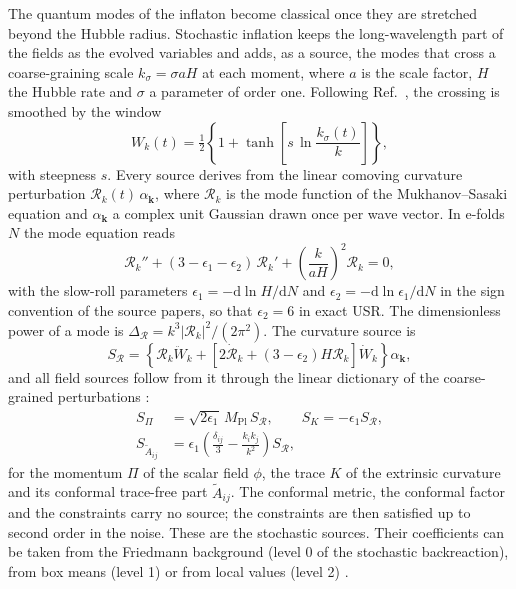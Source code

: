 \documentclass[aps,prd,twocolumn,10pt,superscriptaddress,nofootinbib,longbibliography,floatfix]{revtex4-2}
\newcommand{\dd}{\mathrm{d}}
\newcommand{\Mpl}{M_\mathrm{Pl}}
\begin{document}
The quantum modes of the inflaton become classical once they are stretched beyond the Hubble radius. Stochastic inflation keeps the long-wavelength part of the fields as the evolved variables and adds, as a source, the modes that cross a coarse-graining scale $k_\sigma=\sigma aH$ at each moment, where $a$ is the scale factor, $H$ the Hubble rate and $\sigma$ a parameter of order one. Following Ref.~\cite{Launay:2025sinr}, the crossing is smoothed by the window
\begin{equation}\label{eq:window}
W_k(t)=\tfrac12\left\{1+\tanh\!\left[s\,\ln\frac{k_\sigma(t)}{k}\right]\right\},
\end{equation}
with steepness $s$. Every source derives from the linear comoving curvature perturbation $\mathcal{R}_k(t)\,\alpha_{\bm k}$, where $\mathcal{R}_k$ is the mode function of the Mukhanov--Sasaki equation and $\alpha_{\bm k}$ a complex unit Gaussian drawn once per wave vector. In e-folds $N$ the mode equation reads
\begin{equation}\label{eq:ms}
\mathcal{R}_k''+(3-\epsilon_1-\epsilon_2)\,\mathcal{R}_k'+\left(\frac{k}{aH}\right)^2\mathcal{R}_k=0,
\end{equation}
with the slow-roll parameters $\epsilon_1=-\dd\ln H/\dd N$ and $\epsilon_2=-\dd\ln\epsilon_1/\dd N$ in the sign convention of the source papers, so that $\epsilon_2=6$ in exact USR. The dimensionless power of a mode is $\Delta_\mathcal{R}=k^3|\mathcal{R}_k|^2/(2\pi^2)$. The curvature source is
\begin{equation}\label{eq:SR}
S_\mathcal{R}=\left\{\mathcal{R}_k\ddot W_k+\left[2\dot{\mathcal{R}}_k+(3-\epsilon_2)H\mathcal{R}_k\right]\dot W_k\right\}\alpha_{\bm k},
\end{equation}
and all field sources follow from it through the linear dictionary of the coarse-grained perturbations \cite{Launay:2024sigr,Launay:2025sinr}:
\begin{equation}\label{eq:sources}
\begin{aligned}
S_\Pi&=\sqrt{2\epsilon_1}\,\Mpl\,S_\mathcal{R},\qquad S_K=-\epsilon_1S_\mathcal{R},\\
S_{\tilde A_{ij}}&=\epsilon_1\left(\frac{\delta_{ij}}{3}-\frac{k_ik_j}{k^2}\right)S_\mathcal{R},
\end{aligned}
\end{equation}
for the momentum $\Pi$ of the scalar field $\phi$, the trace $K$ of the extrinsic curvature and its conformal trace-free part $\tilde A_{ij}$. The conformal metric, the conformal factor and the constraints carry no source; the constraints are then satisfied up to second order in the noise. These are the stochastic sources. Their coefficients can be taken from the Friedmann background (level 0 of the stochastic backreaction), from box means (level 1) or from local values (level 2) \cite{Launay:2025sinr}.
\end{document}
